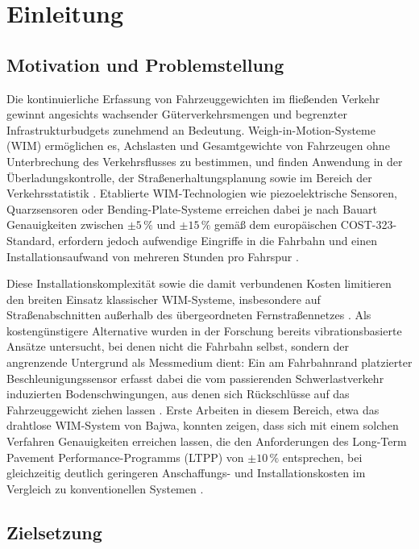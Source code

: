 \chapter{Einleitung}

\section{Motivation und Problemstellung}

Die kontinuierliche Erfassung von Fahrzeuggewichten im fließenden Verkehr gewinnt angesichts wachsender Güterverkehrsmengen und begrenzter Infrastrukturbudgets zunehmend an Bedeutung. Weigh-in-Motion-Systeme (WIM) ermöglichen es, Achslasten und Gesamtgewichte von Fahrzeugen ohne Unterbrechung des Verkehrsflusses zu bestimmen, und finden Anwendung in der Überladungskontrolle, der Straßenerhaltungsplanung sowie im Bereich der Verkehrsstatistik \cite{QFree2020}. Etablierte WIM-Technologien wie piezoelektrische Sensoren, Quarzsensoren oder Bending-Plate-Systeme erreichen dabei je nach Bauart Genauigkeiten zwischen $\pm 5\,\%$ und $\pm 15\,\%$ gemäß dem europäischen COST-323-Standard, erfordern jedoch aufwendige Eingriffe in die Fahrbahn und einen Installationsaufwand von mehreren Stunden pro Fahrspur \cite{QFree2020}.

Diese Installationskomplexität sowie die damit verbundenen Kosten limitieren den breiten Einsatz klassischer WIM-Systeme, insbesondere auf Straßenabschnitten außerhalb des übergeordneten Fernstraßennetzes \cite{Adresi2024}. Als kostengünstigere Alternative wurden in der Forschung bereits vibrationsbasierte Ansätze untersucht, bei denen nicht die Fahrbahn selbst, sondern der angrenzende Untergrund als Messmedium dient: Ein am Fahrbahnrand platzierter Beschleunigungssensor erfasst dabei die vom passierenden Schwerlastverkehr induzierten Bodenschwingungen, aus denen sich Rückschlüsse auf das Fahrzeuggewicht ziehen lassen \cite{Bajwa:EECS-2013-210}. Erste Arbeiten in diesem Bereich, etwa das drahtlose WIM-System von Bajwa, konnten zeigen, dass sich mit einem solchen Verfahren Genauigkeiten erreichen lassen, die den Anforderungen des Long-Term Pavement Performance-Programms (LTPP) von $\pm 10\,\%$ entsprechen, bei gleichzeitig deutlich geringeren Anschaffungs- und Installationskosten im Vergleich zu konventionellen Systemen \cite{Bajwa:EECS-2013-210, Khalili2022}.

\section{Zielsetzung}

